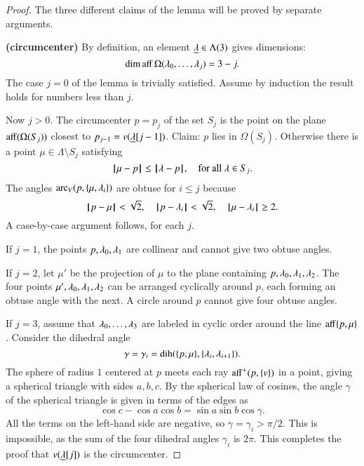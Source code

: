\begin{proof} The three different claims of the lemma will be proved by separate arguments.

{\bf (circumcenter)} By definition, an element ${\underline{\lambda}}\in\Lambda(3)$ gives dimensions: 
$$\operatorname{dim\,aff}\Omega(\lambda_0,\ldots,\lambda_j) = 3-j.$$  The case $j=0$ of the lemma is trivially
satisfied.  Assume by induction the result holds for numbers less than $j$.

Now $j>0$.
The circumcenter $p=p_{j}$ of the set $S_{j}$ is the point on the plane ${\operatorname{aff}}(\Omega(S_{j}))$
closest to $p_{j-1}=v({\underline{\lambda}}[j-1])$.  Claim:  $p$ lies in $\Omega(S_{j})$.  Otherwise
there is a point $\mu\in\Lambda\setminus S_j$ satisfying
\begin{equation}\label{eqn:closest}
{\hskip0.1em|\hskip-0.15em|\hskip0.1em}\mu - p{\hskip0.1em|\hskip-0.15em|\hskip0.1em}\le {\hskip0.1em|\hskip-0.15em|\hskip0.1em}\lambda - p{\hskip0.1em|\hskip-0.15em|\hskip0.1em}, \quad\text{for all } \lambda\in S_j.
\end{equation}
The angles $\operatorname{arc}_V(p,\{\mu,\lambda_i\})$ are obtuse for $i\le j$ because
$$
{\hskip0.1em|\hskip-0.15em|\hskip0.1em}p - \mu{\hskip0.1em|\hskip-0.15em|\hskip0.1em} < \sqrt2,\quad {\hskip0.1em|\hskip-0.15em|\hskip0.1em}p - \lambda_i{\hskip0.1em|\hskip-0.15em|\hskip0.1em} <\sqrt2,\quad {\hskip0.1em|\hskip-0.15em|\hskip0.1em}\mu - \lambda_i{\hskip0.1em|\hskip-0.15em|\hskip0.1em} \ge 2.
$$ 
A case-by-case argument follows, for each $j$.

If $j=1$, the points $p,\lambda_0,\lambda_1$ are collinear and cannot give two obtuse angles.

If $j=2$, let $\mu'$ be the projection of $\mu$ to the plane containing
$p,\lambda_0,\lambda_1,\lambda_2$. The four points $\mu',\lambda_0,\lambda_1,\lambda_2$ can be arranged
cyclically around $p$, each forming an obtuse angle with the next.  A circle around $p$
cannot give four obtuse angles.


If $j=3$, assume that $\lambda_0,\ldots,\lambda_3$ are labeled in cyclic order around the line
${\operatorname{aff}}\{p,\mu\}$.  Consider the dihedral angle 
  $$
  \gamma=\gamma_i=\operatorname{dih}(\{p,\mu\},\{\lambda_i,\lambda_{i+1}\}).
  $$
The sphere of radius $1$ centered at $p$ meets each ray
${\operatorname{aff}}^+(p,\{v\})$ in a point, giving a spherical triangle with sides $a,b,c$.  By the spherical law of cosines, the angle $\gamma$ of the spherical triangle is given in terms of the edges as
$$
  \cos c - \cos a \cos b = \sin a \sin b \cos \gamma.
$$
All the terms on the left-hand side are negative, so $\gamma =\gamma_i > \pi/2$.
This is impossible, as the sum of the four dihedral angles $\gamma_i$ is $2\pi$.
This completes the proof that $v({\underline{\lambda}}[j])$ is the circumcenter.


\end{proof}
